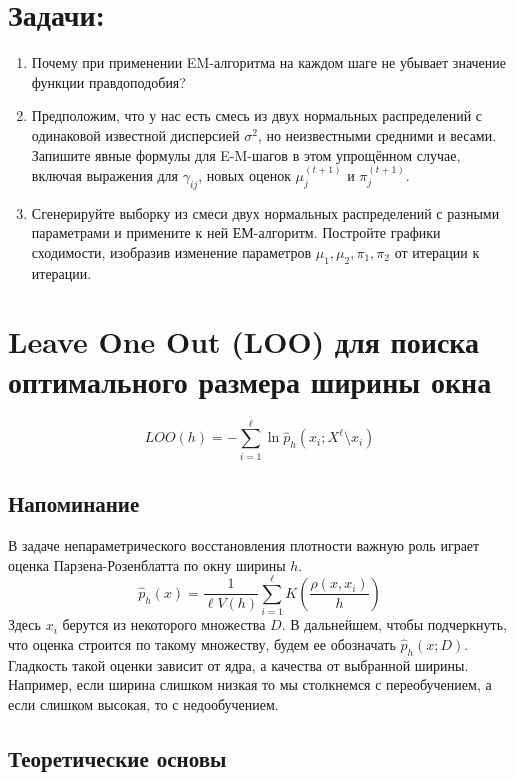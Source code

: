 \section*{\textbf{Задачи:}}

\begin{enumerate}
    \item Почему при применении EM-алгоритма на каждом шаге не убывает значение функции правдоподобия?

    \item Предположим, что у нас есть смесь из двух нормальных распределений с одинаковой известной дисперсией $\sigma^2$, но неизвестными средними и весами. Запишите явные формулы для E-M-шагов в этом упрощённом случае, включая выражения для $\gamma_{ij}$, новых оценок $\mu_j^{(t+1)}$ и $\pi_j^{(t+1)}$.

    \item Сгенерируйте выборку из смеси двух нормальных распределений с разными параметрами и примените к ней ЕМ-алгоритм. Постройте графики сходимости, изобразив изменение параметров $\mu_1, \mu_2, \pi_1, \pi_2$ от итерации к итерации.
\end{enumerate}


\section*{Leave One Out (LOO) для поиска оптимального размера ширины окна}

\[
    LOO(h) = -\sum_{i=1}^{\ell} \ln \hat{p}_h(x_i; X^\ell \setminus x_i)
\]

\subsection*{Напоминание}

В задаче непараметрического восстановления плотности важную роль играет оценка Парзена-Розенблатта по окну ширины $h$.
\[
    \hat{p}_h(x) = \frac{1}{\ell V(h)} \sum_{i=1}^{\ell} K\left(\frac{\rho(x, x_i)}{h}\right)
\]
Здесь $x_i$ берутся из некоторого множества $D$. В дальнейшем, чтобы подчеркнуть, что оценка строится по такому множеству, будем ее обозначать $\hat{p}_h(x; D)$. Гладкость такой оценки зависит от ядра, а качества от выбранной ширины. Например, если ширина слишком низкая то мы столкнемся с переобучением, а если слишком высокая, то с недообучением.

\subsection*{Теоретические основы}

